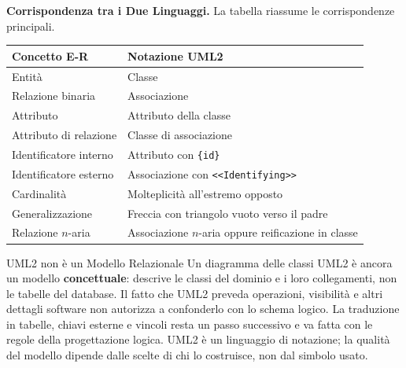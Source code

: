 \documentclass[12pt]{extarticle}
\begin{document}

\medskip
\noindent \textbf{Corrispondenza tra i Due Linguaggi.} La tabella riassume le corrispondenze principali.

\begin{center}
\small
\begin{tabular}{@{}L{6.2cm}L{9.0cm}@{}}
    \toprule
    \textbf{Concetto E-R} & \textbf{Notazione UML2} \\
    \midrule
    Entità & Classe \\
    \addlinespace
    Relazione binaria & Associazione \\
    \addlinespace
    Attributo & Attributo della classe \\
    \addlinespace
    Attributo di relazione & Classe di associazione \\
    \addlinespace
    Identificatore interno & Attributo con \texttt{\{id\}} \\
    \addlinespace
    Identificatore esterno & Associazione con \texttt{<{}<Identifying>{}>} \\
    \addlinespace
    Cardinalità & Molteplicità all'estremo opposto \\
    \addlinespace
    Generalizzazione & Freccia con triangolo vuoto verso il padre \\
    \addlinespace
    Relazione $n$-aria & Associazione $n$-aria oppure reificazione in classe \\
    \bottomrule
\end{tabular}
\end{center}

\begin{cbox}{UML2 non è un Modello Relazionale}
\noindent Un diagramma delle classi UML2 è ancora un modello \textbf{concettuale}: descrive le classi del dominio e i loro collegamenti, non le tabelle del database. Il fatto che UML2 preveda operazioni, visibilità e altri dettagli software non autorizza a confonderlo con lo schema logico. La traduzione in tabelle, chiavi esterne e vincoli resta un passo successivo e va fatta con le regole della progettazione logica. UML2 è un linguaggio di notazione; la qualità del modello dipende dalle scelte di chi lo costruisce, non dal simbolo usato.
\end{cbox}
\end{document}

